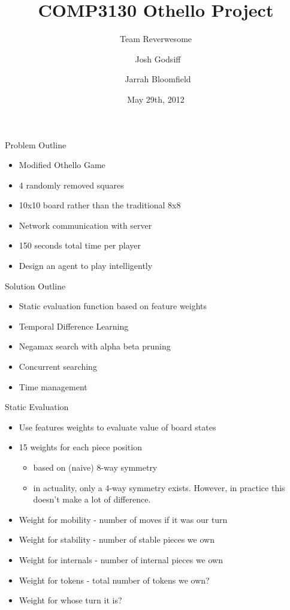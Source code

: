 \documentclass{beamer}
\title[Team Reverwesome: Othello Bot] %
{COMP3130 Othello Project}
\subtitle
{Team Reverwesome} %
\author[Josh Godsiff, Jarrah Bloomfield] %
{~Josh Godsiff \and ~Jarrah Bloomfield}
\date[Short Occasion] %
{May 29th, 2012}
\begin{document}
\begin{frame}
  \titlepage
\end{frame}

\begin{frame}{Problem Outline}
    \begin{itemize}
  \item
    Modified Othello Game
  \item
    4 randomly removed squares
  \item
    10x10 board rather than the traditional 8x8
  \item
    Network communication with server
  \item
    150 seconds total time per player
  \item
    Design an agent to play intelligently
  \end{itemize}
\end{frame}

\begin{frame}{Solution Outline}
    \begin{itemize}
  \item
    Static evaluation function based on feature weights
  \item
    Temporal Difference Learning
  \item
    Negamax search with alpha beta pruning
  \item
    Concurrent searching
  \item
    Time management
  \end{itemize}
\end{frame}

\begin{frame}{Static Evaluation}
    \begin{itemize}
  \item
    Use features weights to evaluate value of board states
  \item
    15 weights for each piece position
	\begin{itemize}
		\item based on (naive) 8-way symmetry
		\item in actuality, only a 4-way symmetry exists. However, in practice this doesn't make a lot of difference.
	\end{itemize}
  \item
    Weight for mobility - number of moves if it was our turn
  \item
   Weight for stability - number of stable pieces we own
  \item
   Weight for internals - number of internal pieces we own
  \item
   Weight for tokens - total number of tokens we own?
  \item
   Weight for whose turn it is?
  \end{itemize}
\end{frame}
\end{document}
